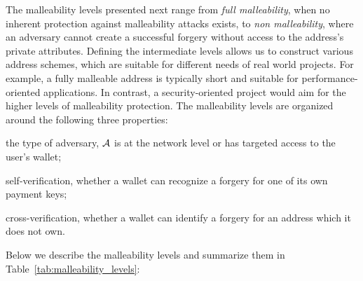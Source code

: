 The malleability levels presented next range from \emph{full malleability}, \ie
when no inherent protection against malleability attacks exists, to \emph{non
malleability}, \ie where an adversary cannot create a successful forgery
without access to the address's private attributes. Defining the intermediate
levels allows us to construct various address schemes, which are suitable for
different needs of real world projects.  For example, a fully malleable address
is typically short and suitable for performance-oriented applications.  In
contrast, a security-oriented project would aim for the higher levels of
malleability protection. The malleability levels are organized around the
following three properties:
\begin{inparaenum}[i)]
    \item the type of adversary, \ie $\mathcal{A}$ is at the network level or
        has targeted access to the user's wallet;
    \item self-verification, \ie whether a wallet can recognize a forgery
        for one of its own payment keys;
    \item cross-verification, \ie whether a wallet can identify a forgery
        for an address which it does not own.
\end{inparaenum}
Below we describe the malleability levels and summarize them in
Table~\ref{tab:malleability_levels}:
